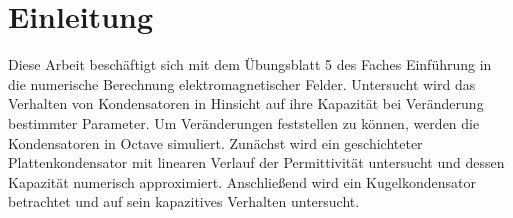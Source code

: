 \chapter{Einleitung}\label{sec:intro}
Diese Arbeit beschäftigt sich mit dem Übungsblatt 5 des Faches \glqq Einführung in die numerische Berechnung elektromagnetischer Felder\grqq{}. Untersucht wird das Verhalten von Kondensatoren in Hinsicht auf ihre Kapazität bei Veränderung bestimmter Parameter. Um Veränderungen feststellen zu können, werden die Kondensatoren in Octave simuliert. Zunächst wird ein geschichteter Plattenkondensator mit linearen Verlauf der Permittivität untersucht und dessen Kapazität numerisch approximiert. Anschließend wird ein Kugelkondensator betrachtet und auf sein kapazitives Verhalten untersucht.